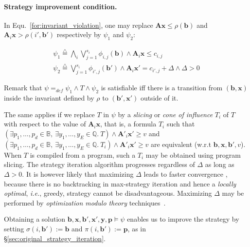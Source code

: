 \documentclass{llncs}
\newcommand{\pponly}[1]{}
\newcommand{\rronly}[1]{#1}
\newcommand{\BB}{\mathbb{B}}
\newcommand{\QQ}{\mathbb{Q}}
\newcommand{\defn}{\stackrel{\triangle}{=}}
\newcommand{\ie}{\textit{i.e.}}
\newcommand{\mat}[1]{{\boldsymbol #1}}
\renewcommand{\vec}[1]{{\boldsymbol #1}}
\begin{document}
\paragraph{Strategy improvement condition.}
In Equ.~\ref{for:invariant_violation},
one may replace $\mat{A}\vec{x} \leq \rho(\vec{b})$ and $\mat{A}_i
\vec{x} > \rho(i',\vec{b} ')$ respectively by $\psi_1$ and $\psi_2$:
\pponly{\vspace*{-1ex}}
\begin{eqnarray}
\psi_1 \defn \bigwedge_i \bigvee_{j=1}^{s_i} \phi_{i,j}(\vec{b})
 \land \mat{A}_i\vec{x} \leq c_{i,j} \label{for:invariant_violation2a}\\[-1ex]
\psi_2 \defn \bigvee_{j=1}^{s_i} \phi_{i',j}(\vec{b}') \land \mat{A}_i\vec{x}' = c_{i',j} + \Delta \land \Delta > 0\label{for:invariant_violation2b}
\end{eqnarray}
\pponly{\vspace*{-3ex}}

Remark that $\psi =_{\mathit{def}} \psi_1 \land T \land \psi_2$ is satisfiable iff
there is a transition from $(\vec{b},\vec{x})$ inside the
invariant defined by $\rho$ to $(\vec{b}',\vec{x}')$ outside of it.
\rronly{
The same applies if we replace $T$ in $\psi$ by a \emph{slicing} or
\emph{cone of influence} $T_i$ of $T$ with respect to the value of
$\mat{A}_i\vec{x}$, that is, a formula $T_i$ such that $(\exists p_1,
\dots, p_d \in \BB, ~ \exists y_1, \dots, y_E \in \QQ.~T) \land
\mat{A}'_i \vec{x}' \geq v$ and $(\exists p_1, \dots, p_d \in \BB, ~
\exists y_1, \dots, y_E \in \QQ.~T_i) \land \mat{A}'_i \vec{x}' \geq
v$ are equivalent (w.r.t $\vec{b},\vec{x},\vec{b}',v$).  When $T$ is
compiled from a program, such a $T_i$ may be obtained using program
slicing.}
The strategy iteration algorithm progresses regardless of $\Delta$ as
long as $\Delta>0$. 
\rronly{It is however likely that maximizing $\Delta$
leads to faster convergence \cite[p.~26]{Gawlitza_Monniaux_LMCS12},
because there is no backtracking in max-strategy iteration and hence a
\emph{locally optimal}, \ie, greedy, strategy cannot be
disadvantageous.  Maximizing $\Delta$ may be performed by
\emph{optimization modulo theory}
techniques~\cite{DBLP:conf/sat/NieuwenhuisO06,DBLP:conf/cade/SebastianiT12,LAK+14}.}

Obtaining a solution
$\vec{b},\vec{x},\vec{b}',\vec{x}',\vec{y},\vec{p} \models \psi$
enables us to improve the strategy by setting
$\sigma(i,\vec{b}'):=\vec{b}$ and $\pi(i,\vec{b}'):=\vec{p}$, as in
\S\ref{sec:original_strategy_iteration}.
\end{document}
